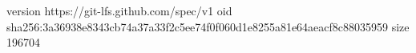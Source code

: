 version https://git-lfs.github.com/spec/v1
oid sha256:3a36938e8343cb74a37a33f2c5ee74f0f060d1e8255a81e64aeacf8c88035959
size 196704
